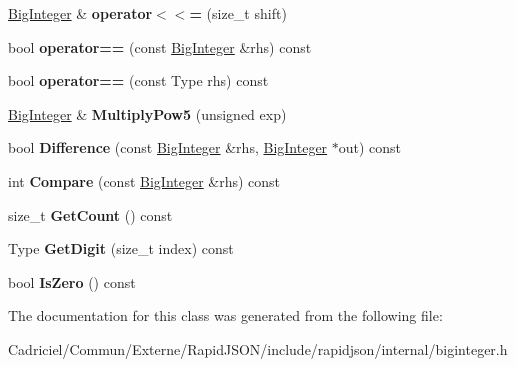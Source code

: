 \begin{DoxyCompactItemize}
\item 
\hyperlink{classinternal_1_1_big_integer}{Big\+Integer} \& {\bfseries operator$<$$<$=} (size\+\_\+t shift)\hypertarget{classinternal_1_1_big_integer_a48b12ef4676f19290dfd5816a4ef4a88}{}\label{classinternal_1_1_big_integer_a48b12ef4676f19290dfd5816a4ef4a88}

\item 
bool {\bfseries operator==} (const \hyperlink{classinternal_1_1_big_integer}{Big\+Integer} \&rhs) const \hypertarget{classinternal_1_1_big_integer_a567ecda3009de20400a2af649fb87e60}{}\label{classinternal_1_1_big_integer_a567ecda3009de20400a2af649fb87e60}

\item 
bool {\bfseries operator==} (const Type rhs) const \hypertarget{classinternal_1_1_big_integer_a329eddac1b724f82d56af2ee2c8abcc4}{}\label{classinternal_1_1_big_integer_a329eddac1b724f82d56af2ee2c8abcc4}

\item 
\hyperlink{classinternal_1_1_big_integer}{Big\+Integer} \& {\bfseries Multiply\+Pow5} (unsigned exp)\hypertarget{classinternal_1_1_big_integer_a98a13f169c27d1acfa57054f37c61763}{}\label{classinternal_1_1_big_integer_a98a13f169c27d1acfa57054f37c61763}

\item 
bool {\bfseries Difference} (const \hyperlink{classinternal_1_1_big_integer}{Big\+Integer} \&rhs, \hyperlink{classinternal_1_1_big_integer}{Big\+Integer} $\ast$out) const \hypertarget{classinternal_1_1_big_integer_a5741304ce36392adeef716e78b384b61}{}\label{classinternal_1_1_big_integer_a5741304ce36392adeef716e78b384b61}

\item 
int {\bfseries Compare} (const \hyperlink{classinternal_1_1_big_integer}{Big\+Integer} \&rhs) const \hypertarget{classinternal_1_1_big_integer_afd8b15480df5003ee6b6e1b8ecbf5f45}{}\label{classinternal_1_1_big_integer_afd8b15480df5003ee6b6e1b8ecbf5f45}

\item 
size\+\_\+t {\bfseries Get\+Count} () const \hypertarget{classinternal_1_1_big_integer_a720114cef0871c9f9c3c6a5f3a66e66a}{}\label{classinternal_1_1_big_integer_a720114cef0871c9f9c3c6a5f3a66e66a}

\item 
Type {\bfseries Get\+Digit} (size\+\_\+t index) const \hypertarget{classinternal_1_1_big_integer_a92c6854f2388875374cfb9801bea0cc8}{}\label{classinternal_1_1_big_integer_a92c6854f2388875374cfb9801bea0cc8}

\item 
bool {\bfseries Is\+Zero} () const \hypertarget{classinternal_1_1_big_integer_a99cf9cb87491a583c6b7614b0c8654fe}{}\label{classinternal_1_1_big_integer_a99cf9cb87491a583c6b7614b0c8654fe}

\end{DoxyCompactItemize}


The documentation for this class was generated from the following file\+:\begin{DoxyCompactItemize}
\item 
Cadriciel/\+Commun/\+Externe/\+Rapid\+J\+S\+O\+N/include/rapidjson/internal/biginteger.\+h\end{DoxyCompactItemize}

